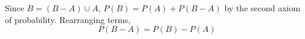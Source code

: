 Since $B = (B-A) \cup A$, $P(B) = P(A) + P(B - A)$ by the second axiom of probability. Rearranging terms,
$$P(B-A) = P(B) - P(A)$$
